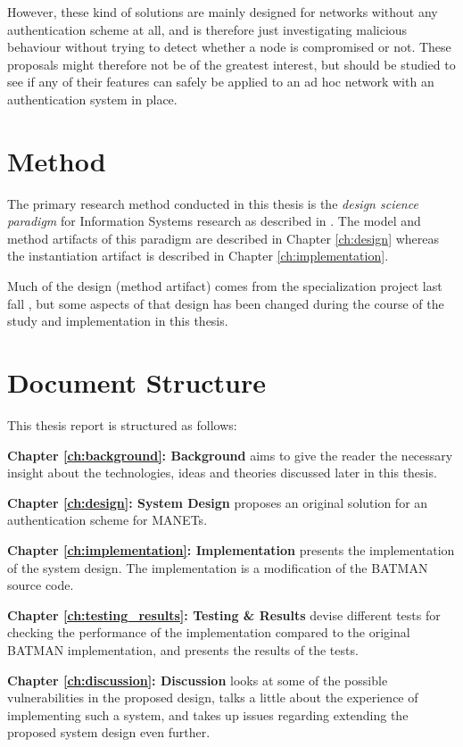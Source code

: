 However, these kind of solutions are mainly designed for networks without any
authentication scheme at all, and is therefore just investigating malicious
behaviour without trying to detect whether a node is compromised or not. These
proposals might therefore not be of the greatest interest, but should be studied
to see if any of their features can safely be applied to an ad hoc network with
an authentication system in place.

\section{Method}
The primary research method conducted in this thesis is the \emph{design
science paradigm} for Information Systems research as described in
\cite{hevner2003information}. The model and method artifacts of this paradigm
are described in Chapter \ref{ch:design} whereas the instantiation artifact is
described in Chapter \ref{ch:implementation}.

Much of the design (method artifact) comes from the specialization project last
fall \cite{bowitz_graarud}, but some aspects of that design has been changed
during the course of the study and implementation in this thesis.

\section{Document Structure}
This thesis report is structured as follows:

\textbf{Chapter \ref{ch:background}: Background} aims to give the reader the
necessary insight about the technologies, ideas and theories discussed later in
this thesis.

\textbf{Chapter \ref{ch:design}: System Design} proposes an original solution
for an authentication scheme for \acp{MANET}.

\textbf{Chapter \ref{ch:implementation}: Implementation} presents the
implementation of the system design. The implementation is a modification of the
\ac{BATMAN} source code.

\textbf{Chapter \ref{ch:testing_results}: Testing \& Results} devise different
tests for checking the performance of the implementation compared to the
original \ac{BATMAN} implementation, and presents the results of the tests.

\textbf{Chapter \ref{ch:discussion}: Discussion} looks at some of the possible
vulnerabilities in the proposed design, talks a little about the experience of
implementing such a system, and takes up issues regarding extending the proposed
system design even further.

